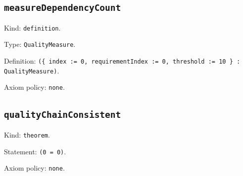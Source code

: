 \documentclass[11pt]{article}
\begin{document}
\subsection*{\texttt{measureDependencyCount}}
\noindent Kind: \texttt{definition}.\par
\noindent Type: \texttt{QualityMeasure}.\par
\noindent Definition: \texttt{(\{ index := 0, requirementIndex := 0, threshold := 10 \} : QualityMeasure)}.\par
\noindent Axiom policy: \texttt{none}.\par
\subsection*{\texttt{qualityChainConsistent}}
\noindent Kind: \texttt{theorem}.\par
\noindent Statement: \texttt{(0 = 0)}.\par
\noindent Axiom policy: \texttt{none}.\par
\end{document}
